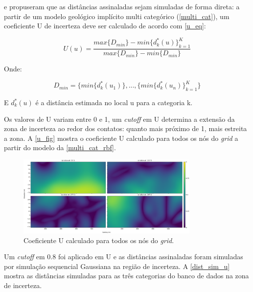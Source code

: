  e  propuseram que as distâncias assinaladas sejam simuladas de forma direta: a partir de um modelo geológico implícito multi categórico (\autoref{multi_cat}), um coeficiente U de incerteza deve ser calculado de acordo com \autoref{u_eq}:

\begin{equation}\label{u_eq}
    U(u)=\frac{max\{D_{min}\}-min\{d^*_k(u)\}^K_{k=1}}{max\{D_{min}\}-min\{D_{min}\}}
\end{equation}

Onde:

\begin{equation}
    D_{min}=\{min\{d^*_k(u_1)\},...,\{min\{d^*_k(u_n)\}^K_{k=1}\}
\end{equation}

E $d^*_k(u)$ é a distância estimada no local u para a categoria k.

Os valores de U variam entre 0 e 1, um \textit{cutoff} em U determina a extensão da zona de incerteza ao redor dos contatos: quanto mais próximo de 1, mais estreita a zona. A \autoref{u_fig} mostra o coeficiente U calculado para todos os nós do \textit{grid} a partir do modelo da \autoref{multi_cat_rbf}.

\begin{figure}[H]
	\caption{\label{u_fig}Coeficiente U calculado para todos os nós do \textit{grid}.}
	\begin{center}
		\includegraphics[width=0.8\textwidth]{capitulo_2/u_coef.png}
	\end{center}
\end{figure}

Um \textit{cutoff} em 0.8 foi aplicado em U e as distâncias assinaladas foram simuladas por simulação sequencial Gaussiana na região de incerteza. A \autoref{dist_sim_u} mostra as distâncias simuladas para as três categorias do banco de dados na zona de incerteza. 


